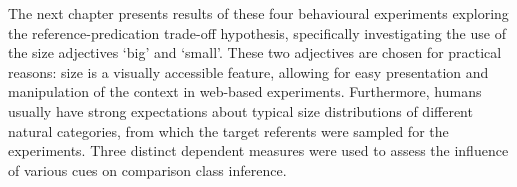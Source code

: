 The next chapter presents results of these four behavioural experiments exploring the reference-predication trade-off hypothesis, specifically investigating the use of the size adjectives ‘big’ and ‘small’. These two adjectives are chosen for practical reasons: size is a visually accessible feature, allowing for easy presentation and manipulation of the context in web-based experiments. Furthermore, humans usually have strong expectations about typical size distributions of different natural categories, from which the target referents were sampled for the experiments. Three distinct dependent measures were used to assess the influence of various cues on comparison class inference. %